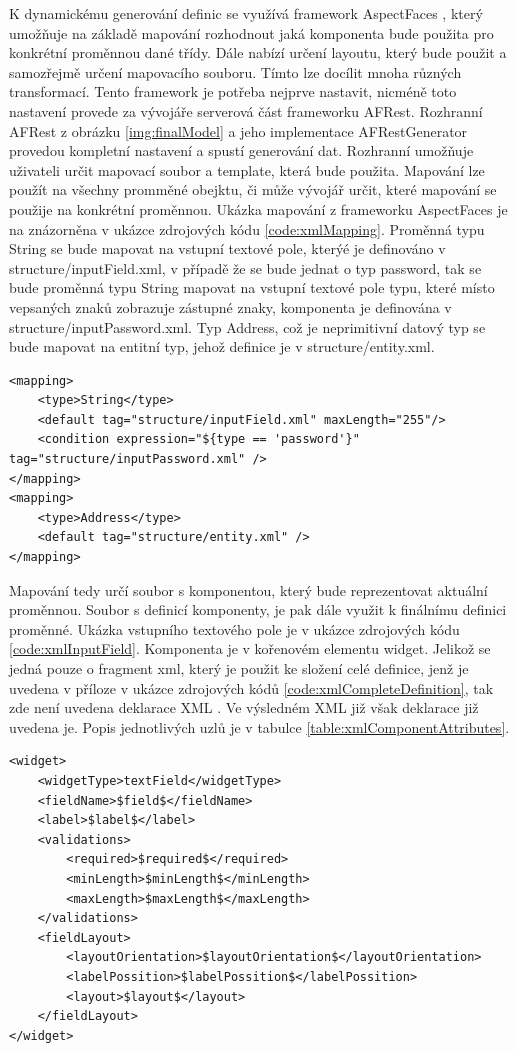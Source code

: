 K dynamickému generování definic se využívá framework AspectFaces \cite{aspectFaces}, který umožňuje na základě mapování rozhodnout jaká komponenta bude použita pro konkrétní proměnnou dané třídy. Dále nabízí určení layoutu, který bude použit a samozřejmě určení mapovacího souboru. Tímto lze docílit mnoha různých transformací. Tento framework je potřeba nejprve nastavit, nicméně toto nastavení provede za vývojáře serverová část frameworku AFRest. Rozhranní AFRest z obrázku \ref{img:finalModel} a jeho implementace AFRestGenerator provedou kompletní nastavení a spustí generování dat. Rozhranní umožňuje uživateli určit mapovací soubor a template, která bude použita. Mapování lze použít na všechny promměné obejktu, či může vývojář určit, které mapování se použije na konkrétní proměnnou. Ukázka mapování z frameworku AspectFaces je na znázorněna v ukázce zdrojových kódu \ref{code:xmlMapping}. Proměnná typu String se bude mapovat na vstupní textové pole, kterýé je definováno v structure/inputField.xml, v případě že se bude jednat o typ password, tak se bude proměnná typu String mapovat na vstupní textové pole typu, které místo vepsaných znaků zobrazuje zástupné znaky, komponenta je definována v structure/inputPassword.xml. Typ Address, což je neprimitivní datový typ se bude mapovat na entitní typ, jehož definice je v structure/entity.xml.
\begin{lstlisting}[caption=Ukázka mapování proměnných na komponenty,
  label={code:xmlMapping}]
<mapping>
	<type>String</type>
	<default tag="structure/inputField.xml" maxLength="255"/>
	<condition expression="${type == 'password'}" tag="structure/inputPassword.xml" />
</mapping>
<mapping>
	<type>Address</type>
	<default tag="structure/entity.xml" />
</mapping>
\end{lstlisting}
Mapování tedy určí soubor s komponentou, který bude reprezentovat aktuální proměnnou. Soubor s definicí komponenty, je pak dále využit k finálnímu definici proměnné. Ukázka vstupního textového pole je v ukázce zdrojových kódu \ref{code:xmlInputField}. Komponenta je v kořenovém elementu widget. Jelikož se jedná pouze o fragment xml, který je použit ke složení celé definice, jenž je uvedena v příloze v ukázce zdrojových kódů \ref{code:xmlCompleteDefinition}, tak zde není uvedena deklarace XML \cite{xml}. Ve výsledném XML již však deklarace již uvedena je. Popis jednotlivých uzlů je v tabulce \ref{table:xmlComponentAttributes}.
\begin{lstlisting}[caption=Ukázka definice komponenty,
  label={code:xmlInputField}]
<widget>
	<widgetType>textField</widgetType>
	<fieldName>$field$</fieldName>
	<label>$label$</label>
	<validations>
		<required>$required$</required>
		<minLength>$minLength$</minLength>
		<maxLength>$maxLength$</maxLength>
	</validations>
	<fieldLayout>
		<layoutOrientation>$layoutOrientation$</layoutOrientation>
		<labelPossition>$labelPossition$</labelPossition>
		<layout>$layout$</layout>
	</fieldLayout>
</widget>
\end{lstlisting}
